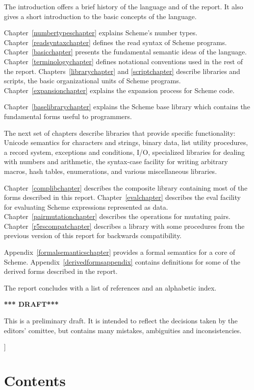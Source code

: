 {The introduction offers a brief history of the language and of
the report.  It also gives a short introduction to the basic concepts
of the language.

Chapter~\ref{numbertypeschapter} explains Scheme's number types.
Chapter~\ref{readsyntaxchapter} defines the read syntax of Scheme
programs.  Chapter~\ref{basicchapter} presents the fundamental
semantic ideas of the language.  Chapter~\ref{terminologychapter}
defines notational conventions used in the rest of the report.
Chapters~\ref{librarychapter} and \ref{scriptchapter} describe
libraries and scripts, the basic organizational units of Scheme
programs.  Chapter~\ref{expansionchapter} explains the expansion
process for Scheme code.

Chapter~\ref{baselibrarychapter} explains the Scheme base library which
contains the fundamental forms useful to programmers.

The next set of chapters describe libraries that provide specific
functionality:
Unicode semantics for characters and strings,
binary data,
list utility procedures,
a record system,
exceptions and conditions,
I/O,
specialized libraries for dealing with numbers and arithmetic,
the {\cf syntax-case} facility for writing arbitrary macros,
hash tables,
enumerations,
and various miscellaneous libraries.

Chapter~\ref{complibchapter} describes the composite library
containing most of the forms described in this report.
Chapter~\ref{evalchapter} describes the {\cf eval} facility for
evaluating Scheme expressions represented as data.
Chapter~\ref{pairmutationchapter} describes the operations for
mutating pairs.  Chapter~\ref{r5rscompatchapter} describes a library
with some procedures from the previous
version of this report for backwards compatibility.

Appendix~\ref{formalsemanticschapter} provides a formal semantics for a
core of Scheme.  Appendix~\ref{derivedformsappendix} contains
definitions for some of the derived forms described in the report.

\vest The report concludes with a list of references and an
alphabetic index.

\bigskip

\begin{center}
{\large \bf
*** DRAFT*** \\
}\end{center}

This is a preliminary draft.  It is intended to reflect the decisions
taken by the editors' comittee, but contains many mistakes,
ambiguities and inconsistencies.

}]

\clearpage

\chapter*{Contents}
\addvspace{3.5pt}                  %
\renewcommand{\tocshrink}{-3.5pt}  %
{\footnotesize
\tableofcontents
}

\vfill
\eject

